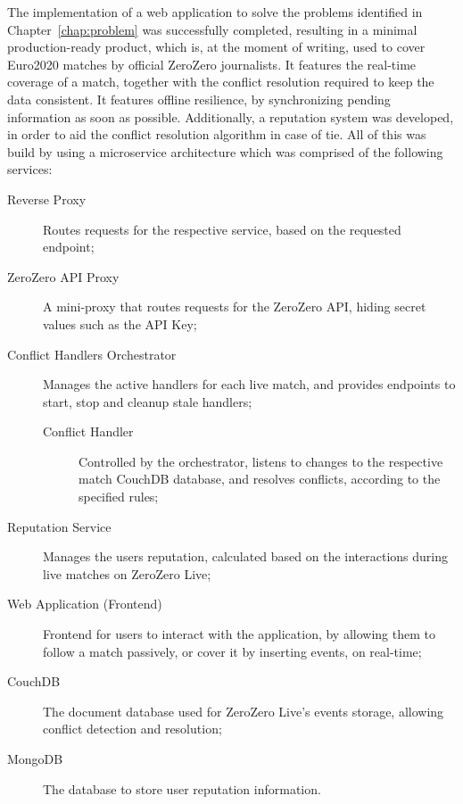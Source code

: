 The implementation of a web application to solve the problems identified in Chapter~\ref{chap:problem} was successfully completed, resulting in a minimal production-ready product, which is, at the moment of writing, used to cover Euro2020 matches by official ZeroZero journalists. It features the real-time coverage of a match, together with the conflict resolution required to keep the data consistent. It features offline resilience, by synchronizing pending information as soon as possible. Additionally, a reputation system was developed, in order to aid the conflict resolution algorithm in case of tie. All of this was build by using a microservice architecture which was comprised of the following services:
\begin{description}
    \item[Reverse Proxy] Routes requests for the respective service, based on the requested endpoint;
    \item[ZeroZero API Proxy] A mini-proxy that routes requests for the ZeroZero API, hiding secret values such as the API Key;
    \item[ Conflict Handlers Orchestrator] Manages the active handlers for each live match, and provides endpoints to start, stop and cleanup stale handlers;
        \begin{description}
            \item[Conflict Handler] Controlled by the orchestrator, listens to changes to the respective match CouchDB database, and resolves conflicts, according to the specified rules;
        \end{description}  
    \item[Reputation Service] Manages the users reputation, calculated based on the interactions during live matches on ZeroZero Live;
    \item[Web Application (Frontend)] Frontend for users to interact with the application, by allowing them to follow a match passively, or cover it by inserting events, on real-time;
    \item[CouchDB] The document database used for ZeroZero Live's events storage, allowing conflict detection and resolution;
    \item[MongoDB] The database to store user reputation information.
\end{description}

